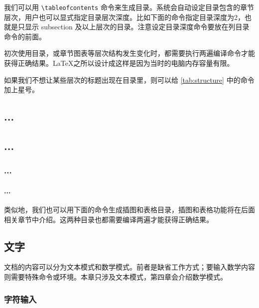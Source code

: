 我们可以用 \verb|\tableofcontents| 命令来生成目录。系统会自动设定目录包含的章节层次，用户也可以显式指定目录层次深度。比如下面的命令指定目录深度为2，也就是只显示 subsection 及以上层次的目录。注意设定目录深度命令要放在列目录命令的前面。

\begin{Code}[]
\setcounter{tocdepth}{2} %
\tableofcontents         %
\end{Code}

初次使用目录，或章节图表等层次结构发生变化时，都需要执行两遍编译命令才能获得正确结果。\LaTeX 之所以设计成这样是因为当时的电脑内存容量有限。

如果我们不想让某些层次的标题出现在目录里，则可以给 \autoref{tab:structure} 中的命令加上星号。

\begin{Code}[]
\chapter*{...}
\section*{...}
\subsection*{...}
\subsubsection*{...}
\end{Code}

类似地，我们也可以用下面的命令生成插图和表格目录，插图和表格功能将在后面相关章节中介绍。这两种目录也都需要编译两遍才能获得正确结果。

\begin{Code}[]
\listoffigures
\listoftables
\end{Code}

\section{文字}

文档的内容可以分为文本模式和数学模式。前者是缺省工作方式；要输入数学内容则需要特殊命令或环境。本章只涉及文本模式，第四章会介绍数学模式。

\subsection{字符输入}
\label{sec:char_input}

